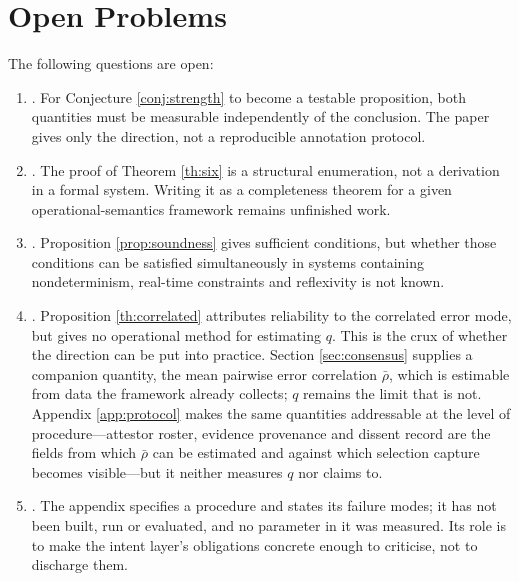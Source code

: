 \section{Open Problems}

The following questions are open:

\begin{enumerate}[label=(O\arabic*)]
\item {}. For Conjecture
      \ref{conj:strength} to become a testable proposition, both quantities must be
      measurable independently of the conclusion. The paper gives only the direction, not a
      reproducible annotation protocol.
\item {}. The proof of
      Theorem \ref{th:six} is a structural enumeration, not a derivation in a formal system.
      Writing it as a completeness theorem for a given operational-semantics framework
      remains unfinished work.
\item {}. Proposition \ref{prop:soundness}
      gives sufficient conditions, but whether those conditions can be satisfied
      simultaneously in systems containing nondeterminism, real-time constraints and
      reflexivity is not known.
\item {}\label{op:q}. Proposition \ref{th:correlated}
      attributes reliability to the correlated error mode, but gives no operational method
      for estimating $q$. This is the crux of whether the direction can be put into
      practice. Section \ref{sec:consensus} supplies a companion quantity, the mean pairwise
      error correlation $\bar\rho$, which is estimable from data the framework already collects;
      $q$ remains the limit that is not. Appendix \ref{app:protocol} makes the same quantities
      addressable at the level of procedure---attestor roster, evidence provenance and dissent
      record are the fields from which $\bar\rho$ can be estimated and against which selection
      capture becomes visible---but it neither measures $q$ nor claims to.
\item {}. The appendix
      specifies a procedure and states its failure modes; it has not been built, run or
      evaluated, and no parameter in it was measured. Its role is to make the intent layer's
      obligations concrete enough to criticise, not to discharge them.

\end{enumerate}
